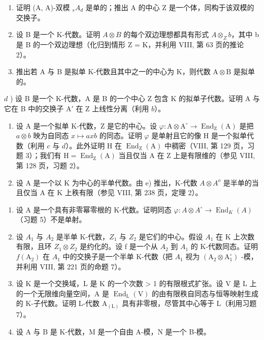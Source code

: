 \begin{enumerate}
\def\labelenumi{\alph{enumi})}
\item
  证明 (A, A)-双模 \(_{s}A_{d}\) 是单的；推出 A 的中心 Z 是一个体，同构于该双模的交换子。
\item
  设 B 是一个 K-代数。证明 \(A \otimes B\) 的每个双边理想都具有形式 \(A \otimes_{Z} b\)，其中 b 是 B 的一个双边理想（化归到情形 Z = K，并利用 VIII, 第 63 页的推论 2）。
\item
  推出若 A 与 B 是拟单 K-代数且其中之一的中心为 K，则代数 \(\mathrm{A} \otimes \mathrm{B}\) 是拟单的。
\end{enumerate}

\(d\) ) 设 B 是一个 K-代数，A 是 B 的一个中心 Z 包含 K 的拟单子代数。证明 A 与它在 B 中的交换子 \(\mathrm{A}'\) 在 Z 上线性分离（利用 \(b\)）。

\begin{enumerate}
\def\labelenumi{\alph{enumi})}
\setcounter{enumi}{4}
\item
  设 A 是一个拟单 K-代数，Z 是它的中心。设 \(\varphi : \mathrm{A} \otimes \mathrm{A}^{\circ} \to \operatorname{End}_{\mathrm{Z}}(\mathrm{A})\) 是把 \(a \otimes b\) 映为自同态 \(x \mapsto axb\) 的同态。证明 \(\varphi\) 是单射且它的像 H 是一个拟单代数（利用 \(c\) 与 \(d\)）。此外证明 H 在 \(\operatorname{End}_{\mathrm{Z}}(\mathrm{A})\) 中稠密（VIII, 第 129 页，习题 3）；我们有 \(\mathrm{H} = \operatorname{End}_{\mathrm{Z}}(\mathrm{A})\) 当且仅当 A 在 Z 上是有限维的（参见 VIII, 第 128 页，习题 2）。
\item
  设 A 是一个以 K 为中心的半单代数。由 e) 推出，K-代数 \(A \otimes A^{o}\) 是半单的当且仅当 A 在 K 上秩有限（参见 VIII, 第 238 页，定理 2）。
\end{enumerate}

\begin{enumerate}
\def\labelenumi{\arabic{enumi})}
\setcounter{enumi}{5}
\item
  设 A 是一个具有非零幂零根的 K-代数。证明同态 \(\varphi: A \otimes A^{\circ} \to \operatorname{End}_{K}(A)\)（习题 5）不是单射。
\item
  设 \(A_{1}\) 与 \(A_{2}\) 是半单 K-代数，\(Z_{1}\) 与 \(Z_{2}\) 是它们的中心。假设 \(A_{1}\) 在 K 上次数有限，且环 \(Z_{1} \otimes Z_{2}\) 是约化的。设 f 是一个从 \(A_{2}\) 到 \(A_{1}\) 的 K-代数同态。证明 \(f(\mathrm{A}_{2})\) 在 \(A_{1}\) 中的交换子是一个半单 K-代数（把 \(A_{1}\) 视为 \((\mathrm{A}_{2} \otimes \mathrm{A}_{1}^{\circ})\) -模，并利用 VIII, 第 221 页的命题 7）。
\item
  设 K 是一个交换域，L 是 K 的一个次数 \textgreater{} 1 的有限根式扩张。设 V 是 L 上的一个无限维向量空间，A 是 \(\operatorname{End}_{\mathrm{L}}(\mathrm{V})\) 的由有限秩自同态与恒等映射生成的 K-子代数。证明 L-代数 \(\mathrm{A}_{(\mathrm{L})}\) 具有非零根，尽管其中心等于 L（利用习题 7）。
\item
  设 A 与 B 是 K-代数，M 是一个自由 A-模，N 是一个 B-模。
\end{enumerate}

